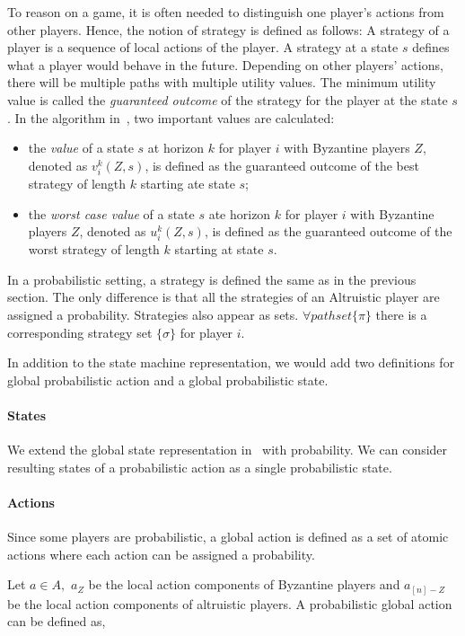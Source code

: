 To reason on a game, it is often needed to distinguish one player's actions from other players. Hence, the notion of strategy is defined as follows: A strategy of a player is a sequence of local actions of the player. A strategy at a state $s$ defines what a player would behave in the future. Depending on other players' actions, there will be multiple paths with multiple utility values. The minimum utility value is called the \emph{guaranteed outcome} of the strategy for the player at the state $s$. In the algorithm in~\cite{MMS08}, two important values are calculated: 
\begin{itemize}
	\item the \emph{value} of a state $s$ at horizon $k$ for player $i$ with Byzantine players $Z$, denoted as $v_i^{k}(Z, s)$, is defined as the guaranteed outcome of the best strategy of length $k$ starting ate state $s$;
	\item the \emph{worst case value} of a state $s$ ate horizon $k$ for player $i$ with Byzantine players $Z$, denoted as $u_i^{k}(Z, s)$, is defined as the guaranteed outcome of the worst strategy of length $k$ starting at state $s$.
\end{itemize}
In a probabilistic setting, a strategy is defined the same as in the previous section. The only difference is that all the strategies of an Altruistic player are assigned a probability. Strategies also appear as sets. $\forall path set \{\pi \}$
there is a corresponding strategy set $\{\sigma \}$ for player $i$. 

In addition to the state machine representation, we would add two definitions for global probabilistic action and a global probabilistic state.

\paragraph{States}
We extend the global state representation in~\cite{MMS08} with probability. We can consider resulting states of a probabilistic action as a single probabilistic state.

\paragraph{Actions}
Since some players are probabilistic, a global action is defined as a set of atomic actions where each action can be assigned a probability. 

Let $a \in A,$ $a_Z$ be the local action components of Byzantine players and $a_{[n]-Z}$ be the local action components of altruistic players. A probabilistic global action can be defined as, \newline

